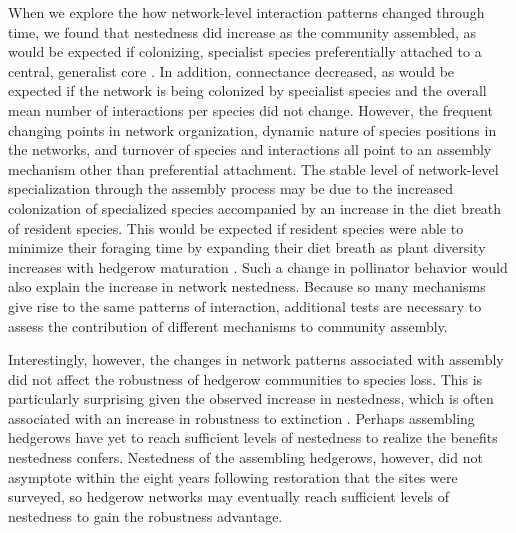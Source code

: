 \documentclass[12pt]{article}
\begin{document}
When we explore the how network-level interaction patterns changed
through time, we found that nestedness did increase as the community
assembled, as would be expected if colonizing, specialist species
preferentially attached to a central, generalist core
\citep{albrecht2010plant}. In addition, connectance decreased, as
would be expected if the network is being colonized by specialist
species and the overall mean number of interactions per species did
not change. However, the frequent changing points in network
organization, dynamic nature of species positions in the networks, and
turnover of species and interactions all point to an assembly
mechanism other than preferential attachment.  The stable level of
network-level specialization through the assembly process may be due
to the increased colonization of specialized species
\citep{mgonigle-2015-x} accompanied by an increase in the diet breath
of resident species. This would be expected if resident species were
able to minimize their foraging time by expanding their diet breath as
plant diversity increases with hedgerow maturation \citep{Waser1996,
  pyke1984optimal, Bluthgen2007, albrecht2010plant}. Such a change in
pollinator behavior would also explain the increase in network
nestedness. Because so many mechanisms give rise to the same patterns
of interaction, additional tests are necessary to assess the
contribution of different mechanisms to community assembly.

Interestingly, however, the changes in network patterns associated
with assembly did not affect the robustness of hedgerow communities to
species loss. This is particularly surprising given the observed
increase in nestedness, which is often associated with an increase in
robustness to extinction \citep{Memmott2004}. Perhaps assembling
hedgerows have yet to reach sufficient levels of nestedness to realize
the benefits nestedness confers. Nestedness of the assembling
hedgerows, however, did not asymptote within the eight years following
restoration that the sites were surveyed, so hedgerow networks may
eventually reach sufficient levels of nestedness to gain the
robustness advantage.
\end{document}
